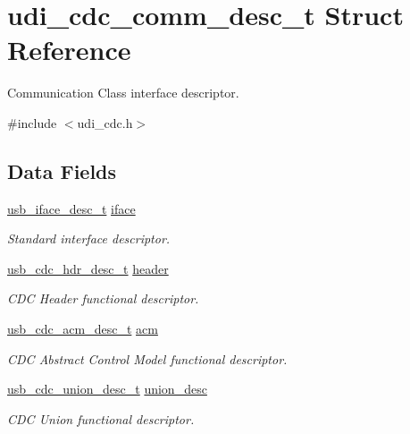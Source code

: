 \hypertarget{structudi__cdc__comm__desc__t}{
\section{udi\-\_\-cdc\-\_\-comm\-\_\-desc\-\_\-t \-Struct \-Reference}
\label{structudi__cdc__comm__desc__t}
}


\-Communication \-Class interface descriptor.  




{\ttfamily \#include $<$udi\-\_\-cdc.\-h$>$}

\subsection*{\-Data \-Fields}
\begin{DoxyCompactItemize}
\item 
\hyperlink{structusb__iface__desc__t}{usb\-\_\-iface\-\_\-desc\-\_\-t} \hyperlink{structudi__cdc__comm__desc__t_a6dfc36e8b57260fa2e77bea312a164da}{iface}
\begin{DoxyCompactList}\small\item\em \-Standard interface descriptor. \end{DoxyCompactList}\item 
\hyperlink{structusb__cdc__hdr__desc__t}{usb\-\_\-cdc\-\_\-hdr\-\_\-desc\-\_\-t} \hyperlink{structudi__cdc__comm__desc__t_a398a1894f61cb98fe155d0d9e6318be1}{header}
\begin{DoxyCompactList}\small\item\em \-C\-D\-C \-Header functional descriptor. \end{DoxyCompactList}\item 
\hyperlink{structusb__cdc__acm__desc__t}{usb\-\_\-cdc\-\_\-acm\-\_\-desc\-\_\-t} \hyperlink{structudi__cdc__comm__desc__t_a6643c3fe52c61dc7cb0cc38a9f324d86}{acm}
\begin{DoxyCompactList}\small\item\em \-C\-D\-C \-Abstract \-Control \-Model functional descriptor. \end{DoxyCompactList}\item 
\hyperlink{structusb__cdc__union__desc__t}{usb\-\_\-cdc\-\_\-union\-\_\-desc\-\_\-t} \hyperlink{structudi__cdc__comm__desc__t_aa23728196c57ec96df6a1372c5696313}{union\-\_\-desc}
\begin{DoxyCompactList}\small\item\em \-C\-D\-C \-Union functional descriptor. \end{DoxyCompactList}\item 

\end{DoxyCompactItemize}

